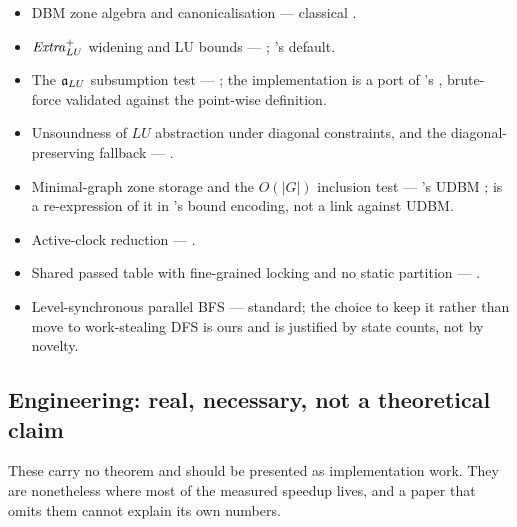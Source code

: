 \begin{itemize}[leftmargin=1.2em, itemsep=3pt]
\item DBM zone algebra and canonicalisation --- classical \cite{Dill89}.
\item $\mathit{Extra}^{+}_{LU}$ widening and LU bounds ---
      \cite{BBLP06}; \uppaal{}'s default.
\item The $\mathfrak{a}_{LU}$ subsumption test --- \cite{HSW12}; the implementation is a
      port of \tchecker{}'s , brute-force validated against the
      point-wise definition.
\item Unsoundness of $LU$ abstraction under diagonal constraints, and the
      diagonal-preserving fallback --- \cite{Bouyer04}.
\item Minimal-graph zone storage and the $O(|G|)$ inclusion test --- \uppaal{}'s
      UDBM ;  is a re-expression of it in
      \tool{}'s bound encoding, not a link against UDBM.
\item Active-clock reduction --- \cite{DawsYovine96}.
\item Shared passed table with fine-grained locking and no static partition ---
      \ltsmin{} \cite{LTSmin,OpaalLTSmin}.
\item Level-synchronous parallel BFS --- standard; the choice to keep it rather
      than move to work-stealing DFS is ours and is justified by state counts,
      not by novelty.
\end{itemize}

\subsection{Engineering: real, necessary, not a theoretical claim}

These carry no theorem and should be presented as implementation work.  They
are nonetheless where most of the measured speedup lives, and a paper that
omits them cannot explain its own numbers.


